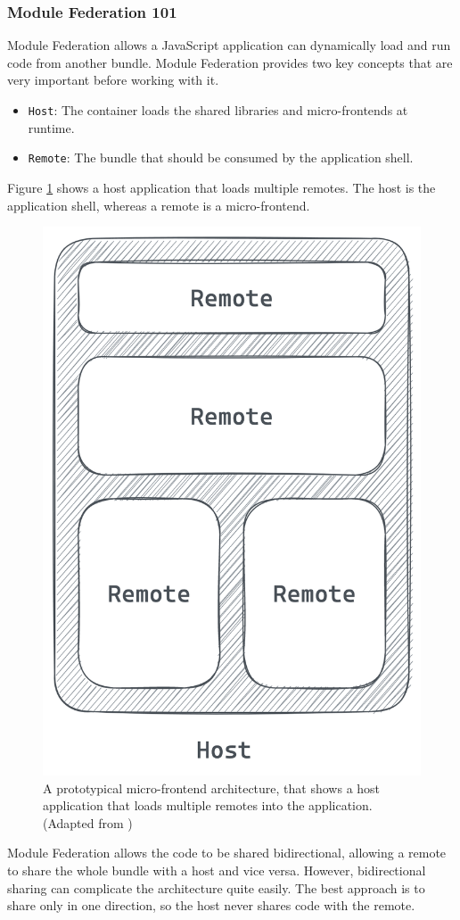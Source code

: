 \subsubsection{Module Federation 101}\label{subsubsection:background:micro-frontend:module-federation:101}

Module Federation allows a JavaScript application can dynamically load and run code from another bundle. Module Federation provides two key concepts that are very important before working with it. \cite[118-119]{book:2021:mezzalira:applied-methods:building-micro-frontends}

\begin{itemize}
    \item \texttt{Host}: The container loads the shared libraries and micro-frontends at runtime.
    \item \texttt{Remote}: The bundle that should be consumed by the application shell.
\end{itemize}

\noindent Figure \ref{fig:background:micro-frontend:module-federation:module-federation-architecture} shows a host application that loads multiple remotes. The host is the application shell, whereas a remote is a micro-frontend.

\ifshowImages
\begin{figure}[H]
    \centering
    \includegraphics[width=0.3\linewidth]{images/background/micro-frontends/module-federation/module-federation-architecture.png}
    \caption{A prototypical micro-frontend architecture, that shows a host application that loads multiple remotes into the application. (Adapted from \cite[119]{book:2021:mezzalira:applied-methods:building-micro-frontends})
    }\label{fig:background:micro-frontend:module-federation:module-federation-architecture}
\end{figure}
\fi

\noindent Module Federation allows the code to be shared bidirectional, allowing a remote to share the whole bundle with a host and vice versa. However, bidirectional sharing can complicate the architecture quite easily. The best approach is to share only in one direction, so the host never shares code with the remote. \cite[119]{book:2021:mezzalira:applied-methods:building-micro-frontends}

